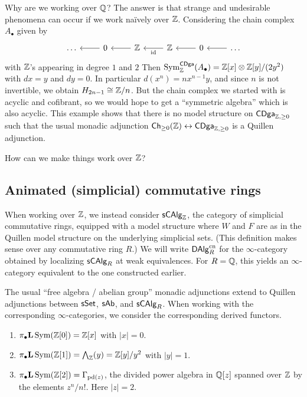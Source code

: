 \documentclass{amsart}
\begin{document}
\begin{ex}
	Why are we working over $\mathbb{Q}$?
	The answer is that strange and undesirable phenomena can occur if we work na\"ively over $\mathbb{Z}$.
	Considering the chain complex $A_\bullet$ given by
	\[
		\begin{tikzcd}
			\dots & 0 \lar & \ZZ \lar & \ZZ \lar["\id"] & 0 \lar & \dots \lar
		\end{tikzcd}
	\]
	with $\mathbb{Z}$'s appearing in degree $1$ and $2$
	Then $\operatorname{Sym}_{\mathbb{Z}}^{\mathsf{CDga}}(A_\bullet) = \mathbb{Z}[x] \otimes \mathbb{Z}[y] / (2y^2)$ with $dx = y$ and $dy = 0$.
	In particular $d(x^n) = n x^{n-1} y$, and since $n$ is not invertible, we obtain $H_{2n-1} \cong \mathbb{Z} / n$.
	But the chain complex we started with is acyclic and cofibrant, so we would hope to get a ``symmetric algebra'' which is also acyclic.
	This example shows that there is no model structure on $\mathsf{CDga}_{\mathbb{Z}, \geq 0}$ such that the usual monadic adjunction $\mathsf{Ch}_{\geq 0}(\mathbb{Z}) \leftrightarrow \mathsf{CDga}_{\mathbb{Z}, \geq 0}$ is a Quillen adjunction.
\end{ex}

How can we make things work over $\mathbb{Z}$?

\subsection{Animated (simplicial) commutative rings}

When working over $\mathbb{Z}$, we instead consider $\mathsf{s}\mathsf{CAlg}_{\mathbb{Z}}$, the category of simplicial commutative rings, equipped with a model structure where $W$ and $F$ are as in the Quillen model structure on the underlying simplicial sets.
(This definition makes sense over any commutative ring $R$.)
We will write $\mathsf{DAlg}_R^{\mathrm{cn}}$ for the $\infty$-category obtained by localizing $\mathsf{s}\mathsf{CAlg}_R$ at weak equivalences.
For $R = \mathbb{Q}$, this yields an $\infty$-category equivalent to the one constructed earlier.

The usual ``free algebra / abelian group'' monadic adjunctions extend to Quillen adjunctions between $\mathsf{sSet}$, $\mathsf{s}\mathsf{Ab}$, and $\mathsf{s}\mathsf{CAlg}_R$.
When working with the corresponding $\infty$-categories, we consider the corresponding derived functors.

\begin{ex}
	\begin{enumerate}
		\item $\pi_\bullet \mathbf{L} \operatorname{Sym} (\mathbb{Z}[0]) = \mathbb{Z}[x]$ with $|x| = 0$.
		\item $\pi_\bullet \mathbf{L} \operatorname{Sym} (\mathbb{Z}[1]) = \bigwedge_{\mathbb{Z}}(y) = \mathbb{Z}[y] / y^2$ with $|y| = 1$.
		\item $\pi_\bullet \mathbf{L} \operatorname{Sym} (\mathbb{Z}[2]) = \Gamma_{\mathrm{pd}(z)}$, the divided power algebra in $\mathbb{Q}[z]$ spanned over $\mathbb{Z}$ by the elements $z^n / n!$.
			Here $|z| = 2$.
	\end{enumerate}
\end{ex}
\end{document}

